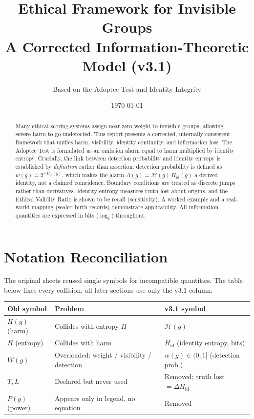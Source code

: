 \documentclass[12pt,a4paper]{article}
\title{Ethical Framework for Invisible Groups \\[4pt]
\large A Corrected Information-Theoretic Model (v3.1)}
\author{Based on the Adoptee Test and Identity Integrity}
\date{\today}
\begin{document}
\maketitle

\begin{abstract}
Many ethical scoring systems assign near-zero weight to invisible groups,
allowing severe harm to go undetected. This report presents a corrected,
internally consistent framework that unifies harm, visibility, identity
continuity, and information loss. The Adoptee Test is formulated as an
omission alarm equal to harm multiplied by identity entropy. Crucially, the
link between detection probability and identity entropy is established by
\emph{definition} rather than assertion: detection probability is defined as
$w(g)=2^{-H_{\mathrm{id}}(g)}$, which makes the alarm
$A(g)=\mathcal{H}(g)\,H_{\mathrm{id}}(g)$ a derived identity, not a claimed
coincidence. Boundary conditions are treated as discrete jumps rather than
derivatives. Identity entropy measures truth lost about origins, and the
Ethical Validity Ratio is shown to be recall (sensitivity). A worked example
and a real-world mapping (sealed birth records) demonstrate applicability.
All information quantities are expressed in bits ($\log_2$) throughout.
\end{abstract}

\section{Notation Reconciliation}

The original sheets reused single symbols for incompatible quantities. The
table below fixes every collision; all later sections use only the v3.1
column.

\begin{center}
\begin{tabular}{lll}
\toprule
\textbf{Old symbol} & \textbf{Problem} & \textbf{v3.1 symbol} \\
\midrule
$H(g)$ (harm) & Collides with entropy $H$ & $\mathcal{H}(g)$ \\
$H$ (entropy) & Collides with harm & $H_{\mathrm{id}}$ (identity entropy, bits) \\
$W(g)$ & Overloaded: weight / visibility / detection & $w(g)\in(0,1]$ (detection prob.) \\
$T,L$ & Declared but never used & Removed; truth lost $=\Delta H_{\mathrm{id}}$ \\
$P(g)$ (power) & Appears only in legend, no equation & Removed \\
\bottomrule
\end{tabular}
\end{center}
\end{document}
